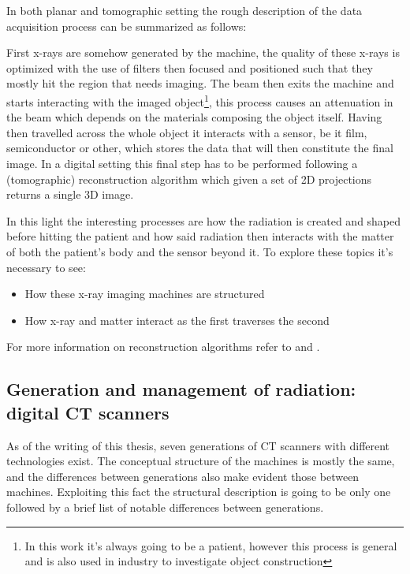 In both planar and tomographic setting the rough description of the data acquisition process can be summarized as follows: 

First x-rays are somehow generated by the machine, the quality of these x-rays is optimized with the use of filters then focused and positioned such that they mostly hit the region that needs imaging. The beam then exits the machine and starts interacting with the imaged object\footnote{In this work it's always going to be a patient, however this process is general and is also used in industry to investigate object construction}, this process causes an attenuation in the beam which depends on the materials composing the object itself. Having then travelled across the whole object it interacts with a sensor, be it film, semiconductor or other, which stores the data that will then constitute the final image. In a digital setting this final step has to be performed following a (tomographic) reconstruction algorithm which given a set of 2D projections returns a single 3D image.

In this light the interesting processes are how the radiation is created and shaped before hitting the patient and how said radiation then interacts with the matter of both the patient's body and the sensor beyond it. To explore these topics it's necessary to see:

\begin{itemize}
\item How these x-ray imaging machines are structured
\item How x-ray and matter interact as the first traverses the second
\end{itemize}

For more information on reconstruction algorithms refer to \cite{xray_reconstruction} and \cite{PhysicsMedicalImaging}.

\subsection{Generation and management of radiation: digital CT scanners}

As of the writing of this thesis, seven generations of CT scanners with different technologies exist. The conceptual structure of the machines is mostly the same, and the differences between generations also make evident those between machines. Exploiting this fact the structural description is going to be only one followed by a brief list of notable differences between generations.

